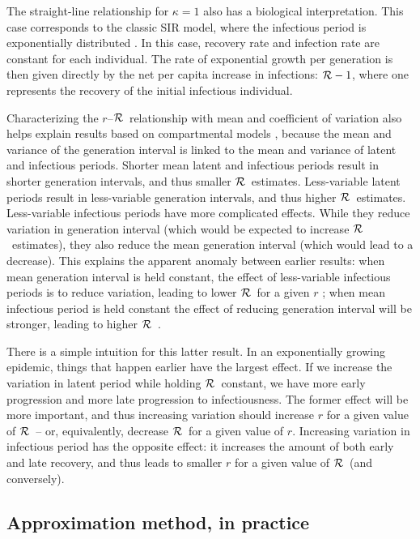 \documentclass[12pt]{article}
\newcommand{\rR}{\mbox{$r$--$\cal R$}}
\newcommand{\RR}{\ensuremath{{\cal R}}}
\begin{document}
The straight-line relationship for $\kappa=1$ also has a biological interpretation. 
This case corresponds to the classic SIR model, where the infectious period is exponentially distributed \cite{anderson1992infectious}.
In this case, recovery rate and infection rate are constant for each individual.
The rate of exponential growth per generation is then given directly by the net per capita increase in infections: $\RR-1$, where one represents the recovery of the initial infectious individual. 

Characterizing the \rR\ relationship with mean and coefficient of variation also helps explain results based on compartmental models \cite{wearing2005appropriate, roberts2007model}, because the mean and variance of the generation interval is linked to the mean and variance of latent and infectious periods.
Shorter mean latent and infectious periods result in shorter generation intervals, and thus smaller \RR\ estimates.
Less-variable latent periods result in less-variable generation intervals, and thus higher \RR\ estimates.
Less-variable infectious periods have more complicated effects. While they reduce variation in generation interval (which would be expected to increase \RR\ estimates), they also reduce the mean generation interval \cite{Sven07} (which would lead to a decrease). 
This explains the apparent anomaly between earlier results: when mean generation interval is held constant, the effect of less-variable infectious periods is to reduce variation, leading to lower \RR\ for a given $r$ \cite{roberts2007model}; when mean infectious period is held constant the effect of reducing generation interval will be stronger, leading to higher \RR\ \cite{wearing2005appropriate}.

There is a simple intuition for this latter result. In an exponentially growing epidemic, things that happen earlier have the largest effect. If we increase the variation in latent period while holding \RR\ constant, we have more early progression and more late progression to infectiousness. The former effect will be more important, and thus increasing variation should increase $r$ for a given value of \RR\ -- or, equivalently, decrease \RR\ for a given value of $r$. Increasing variation in infectious period has the opposite effect: it increases the amount of both early and late recovery, and thus leads to smaller $r$ for a given value of \RR\ (and conversely).

\subsection{Approximation method, in practice}
\end{document}

